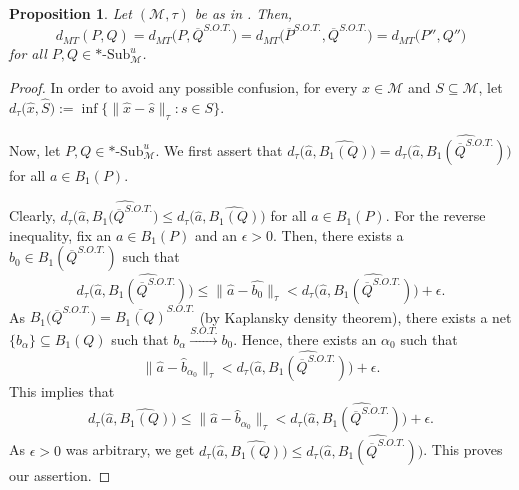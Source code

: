 \documentclass[10pt,a4paper]{amsart}
\newtheorem{proposition}{Proposition}
\newcommand{\mM}{\mathcal{M}}
\begin{document}
\begin{proposition}\label{dMT-SOT}
Let $(\mM, \tau)$ be as in . Then, 
\[
d_{MT}(P,Q) = d_{MT}\Big(P, \overline{Q}^{S.O.T.}\Big) =
d_{MT}\Big(\overline{P}^{S.O.T.}, \overline{Q}^{S.O.T.}\Big) = d_{MT}\Big(P'',
Q''\Big)
\] 
for all $P, Q \in *\text{-}\mathrm{Sub}^u_{\mM}$.
\end{proposition}

\begin{proof}
In order to avoid any possible confusion, for every $x \in \mM$ and $S
\subseteq \mM$, let $d_\tau\big(\widehat{x}, \widehat{S}\big):=\inf \{ \|\widehat{x} -
\widehat{s}\|_\tau : s \in S\}$.

Now, let $P, Q \in *\text{-Sub}^u_{\mM}$.  We first assert that
$d_\tau\Big(\widehat{a}, \widehat{B_1(Q)}\Big) = d_\tau\Big(\widehat{a},
\widehat{B_1(\overline{Q}^{S.O.T.})}\Big)$ for all $a \in B_1(P)$.

Clearly, $d_\tau\Big(\widehat{a}, \widehat{ B_1(\overline{Q}^{S.O.T.}\Big)}\leq
d_\tau\Big(\widehat{a}, \widehat{B_1(Q)}\Big)$ for all $a\in B_1(P)$. For the
reverse inequality, fix an $a \in B_1(P)$ and an $\epsilon>0$. Then,
there exists a $b_{0}\in B_1(\overline{Q}^{S.O.T.})$ such that
\[
d_\tau\Big(\widehat{a},
\widehat{B_1(\overline{Q}^{S.O.T.})}\Big) \leq
\|\widehat{a}-\widehat{b_{0}}\|_{\tau}< d_\tau\Big(\widehat{a},
\widehat{B_1(\overline{Q}^{S.O.T.})}\Big)+ \epsilon.
\]
As $ B_1\Big(\overline{Q}^{S.O.T.}\Big)= \overline{B_1(Q)}^{S.O.T.}$ (by
Kaplansky density theorem), there exists a net
$\{b_{\alpha}\}\subseteq B_1(Q)$ such that
$b_{\alpha}\stackrel{S.O.T.}{\longrightarrow} b_{0}$. Hence, there
exists an $\alpha_{0}$ such that
\[
\|\widehat{a}-\widehat{b}_{\alpha_{0}}\|_{\tau}< d_\tau \Big(\widehat{a},
\widehat{B_1(\overline{Q}^{S.O.T.})}\Big) + \epsilon.
\]
This implies that
\[
d_\tau\big(\widehat{a}, \widehat{B_1(Q)}\big)\leq
\|\widehat{a}-\widehat{b}_{\alpha_{0}}\|_{\tau} <d_\tau \Big(\widehat{a},
\widehat{B_1(\overline{Q}^{S.O.T.})}\Big)+ \epsilon.
\]
As $\epsilon>0$ was arbitrary, we get $d_\tau\Big(\widehat{a},
\widehat{B_1(Q)}\Big)\leq d_\tau\Big(\widehat{a},
\widehat{B_1(\overline{Q}^{S.O.T.})}\Big)$. This proves our assertion.


\end{proof}
\end{document}
